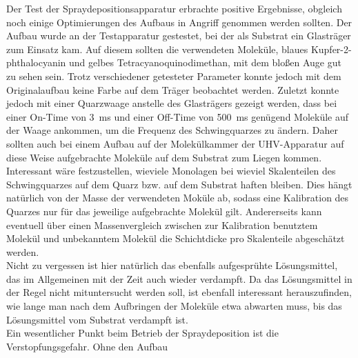 
Der Test der Spraydepositionsapparatur erbrachte positive Ergebnisse, obgleich noch einige
Optimierungen des Aufbaus in Angriff genommen werden sollten. Der Aufbau wurde an der Testapparatur
gestestet, bei der als Substrat ein Glasträger zum Einsatz kam. Auf diesem sollten die verwendeten
Moleküle, blaues Kupfer-2-phthalocyanin und gelbes Tetracyanoquinodimethan, mit dem bloßen Auge gut
zu sehen sein. Trotz verschiedener getesteter Parameter konnte jedoch mit dem Originalaufbau keine
Farbe auf dem Träger beobachtet werden.
Zuletzt konnte jedoch mit einer Quarzwaage anstelle des
Glasträgers gezeigt werden, dass bei einer On-Time von \SI{3}{ms} und einer Off-Time von
\SI{500}{ms} genügend Moleküle auf der Waage ankommen, um die Frequenz des Schwingquarzes zu
ändern. Daher sollten auch bei einem Aufbau auf der Molekülkammer der UHV-Apparatur auf diese Weise
aufgebrachte Moleküle auf dem Substrat zum Liegen kommen. Interessant wäre festzustellen, wieviele
Monolagen bei wieviel Skalenteilen des Schwingquarzes auf dem Quarz bzw. auf dem Substrat haften
bleiben. Dies hängt natürlich von der Masse der verwendeten Moküle ab, sodass eine Kalibration des
Quarzes nur für das jeweilige aufgebrachte Molekül gilt. Andererseits kann eventuell über einen
Massenvergleich zwischen zur Kalibration benutztem Molekül und unbekanntem Molekül die Schichtdicke
pro Skalenteile abgeschätzt werden.
\\
Nicht zu vergessen ist hier natürlich das ebenfalls aufgesprühte Lösungsmittel, das im
Allgemeinen mit der Zeit auch wieder verdampft. Da das Lösungsmittel in der Regel nicht
mituntersucht werden soll, ist ebenfall interessant herauszufinden, wie lange man nach dem
Aufbringen der Moleküle etwa abwarten muss, bis das Lösungsmittel vom Substrat
verdampft ist.
\\
Ein wesentlicher Punkt beim Betrieb der Spraydeposition ist die Verstopfungsgefahr. Ohne den Aufbau
